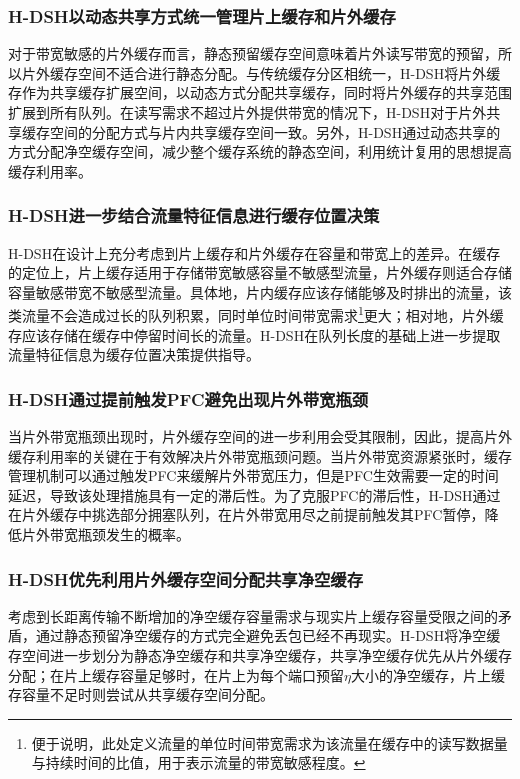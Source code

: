 \subsubsection{H-DSH以动态共享方式统一管理片上缓存和片外缓存}

对于带宽敏感的片外缓存而言，静态预留缓存空间意味着片外读写带宽的预留，所以片外缓存空间不适合进行静态分配。与传统缓存分区相统一，H-DSH将片外缓存作为共享缓存扩展空间，以动态方式分配共享缓存，同时将片外缓存的共享范围扩展到所有队列。在读写需求不超过片外提供带宽的情况下，H-DSH对于片外共享缓存空间的分配方式与片内共享缓存空间一致。另外，H-DSH通过动态共享的方式分配净空缓存空间，减少整个缓存系统的静态空间，利用统计复用的思想提高缓存利用率。

\subsubsection{H-DSH进一步结合流量特征信息进行缓存位置决策}

H-DSH在设计上充分考虑到片上缓存和片外缓存在容量和带宽上的差异。在缓存的定位上，片上缓存适用于存储带宽敏感容量不敏感型流量，片外缓存则适合存储容量敏感带宽不敏感型流量。具体地，片内缓存应该存储能够及时排出的流量，该类流量不会造成过长的队列积累，同时单位时间带宽需求\footnote{便于说明，此处定义流量的单位时间带宽需求为该流量在缓存中的读写数据量与持续时间的比值，用于表示流量的带宽敏感程度。}更大；相对地，片外缓存应该存储在缓存中停留时间长的流量。H-DSH在队列长度的基础上进一步提取流量特征信息为缓存位置决策提供指导。

\subsubsection{H-DSH通过提前触发PFC避免出现片外带宽瓶颈}

当片外带宽瓶颈出现时，片外缓存空间的进一步利用会受其限制，因此，提高片外缓存利用率的关键在于有效解决片外带宽瓶颈问题。当片外带宽资源紧张时，缓存管理机制可以通过触发PFC来缓解片外带宽压力，但是PFC生效需要一定的时间延迟，导致该处理措施具有一定的滞后性。为了克服PFC的滞后性，H-DSH通过在片外缓存中挑选部分拥塞队列，在片外带宽用尽之前提前触发其PFC暂停，降低片外带宽瓶颈发生的概率。

\subsubsection{H-DSH优先利用片外缓存空间分配共享净空缓存}

考虑到长距离传输不断增加的净空缓存容量需求与现实片上缓存容量受限之间的矛盾，通过静态预留净空缓存的方式完全避免丢包已经不再现实。H-DSH将净空缓存空间进一步划分为静态净空缓存和共享净空缓存，共享净空缓存优先从片外缓存分配；在片上缓存容量足够时，在片上为每个端口预留$\eta$大小的净空缓存，片上缓存容量不足时则尝试从共享缓存空间分配。

